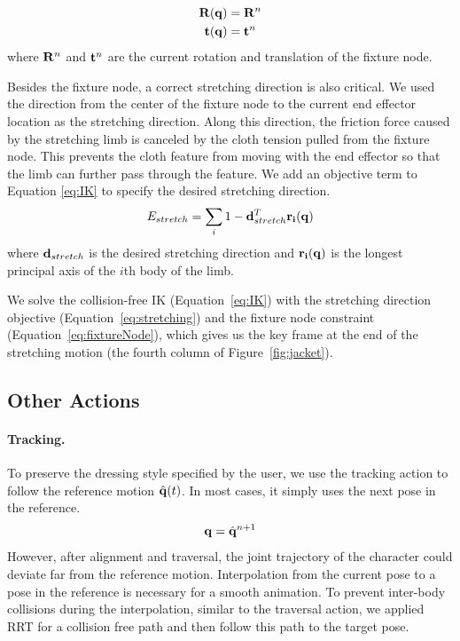 \begin{align}
  \label{eq:fixtureNode}
  \mathbf{R}(\mathbf{q})& = \mathbf{R}^n\\
  \nonumber  \mathbf{t}(\mathbf{q})& = \mathbf{t}^n
\end{align}
where $\mathbf{R}^n$ and $\mathbf{t}^n$ are the current rotation and translation of the fixture node. 

Besides the fixture node, a correct stretching direction is also critical. We used the direction from the center of the fixture node to the current end effector location as the stretching direction. Along this direction, the friction force caused by the stretching limb is canceled by the cloth tension pulled from the fixture node. This prevents the cloth feature from moving with the end effector so that the limb can further pass through the feature. We add an objective term to Equation \ref{eq:IK} to specify the desired stretching direction.
\begin{equation}
  E_{stretch} = \sum_i1 - \mathbf{d}_{stretch}^T\mathbf{r_i(q)}
  \label{eq:stretching}
\end{equation}
where $\mathbf{d}_{stretch}$ is the desired stretching direction and $\mathbf{r_i(q)}$ is the longest principal axis of the $i$th body of the limb.

We solve the collision-free IK (Equation~\ref{eq:IK}) with the stretching direction objective (Equation~\ref{eq:stretching}) and the fixture node constraint (Equation~\ref{eq:fixtureNode}), which gives us the key frame at the end of the stretching motion (the fourth column of Figure~\ref{fig:jacket}).

\subsection{Other Actions}

\paragraph{Tracking.} To preserve the dressing style specified by the user, we use the tracking action to follow the reference motion $\hat{\mathbf{q}}(t)$. In most cases, it simply uses the next pose in the reference.
\begin{displaymath}
\mathbf{q} = \hat{\mathbf{q}}^{n+1}
\end{displaymath}
However, after alignment and traversal, the joint trajectory of the character could deviate far from the reference motion. Interpolation from the current pose to a pose in the reference is necessary for a smooth animation. To prevent inter-body collisions during the interpolation, similar to the traversal action, we applied RRT for a collision free path and then follow this path to the target pose.


